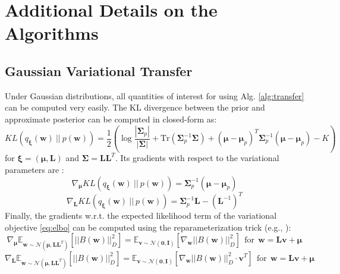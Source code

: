 \documentclass{article}
\begin{document}
\section{Additional Details on the Algorithms}

\subsection{Gaussian Variational Transfer}

Under Gaussian distributions, all quantities of interest for using Alg. \ref{alg:transfer} can be computed very easily. The KL divergence between the prior and approximate posterior can be computed in closed-form as:
\begin{equation}
KL\left(q_{\bm{\xi}}(\bm{w})\ ||\ p(\bm{w})\right) = \frac{1}{2}\left( \log\frac{\left\lvert \bm{\Sigma}_p \right\rvert}{\left\lvert \bm{\Sigma} \right\rvert} + \text{Tr}\left( \bm{\Sigma}_p^{-1}\bm{\Sigma} \right) + (\bm{\mu} - \bm{\mu}_p)^T \bm{\Sigma}_p^{-1} (\bm{\mu} - \bm{\mu}_p) -K \right)
\end{equation}
for $\bm{\xi} = (\bm{\mu},\bm{L})$ and $\bm{\Sigma} = \bm{LL}^T$. Its gradients with respect to the variational parameters are \cite{}:
\begin{equation}
\nabla_{\bm{\mu}} KL\left(q_{\bm{\xi}}(\bm{w})\ ||\ p(\bm{w})\right) = \bm{\Sigma}_p^{-1} (\bm{\mu} - \bm{\mu}_p)
\end{equation}
\begin{equation}
\nabla_{\bm{L}} KL\left(q_{\bm{\xi}}(\bm{w})\ ||\ p(\bm{w})\right) = \bm{\Sigma}_p^{-1}\bm{L} - (\bm{L}^{-1})^T
\end{equation}
Finally, the gradients w.r.t. the expected likelihood term of the variational objective \eqref{eq:elbo} can be computed using the reparameterization trick (e.g., \cite{}):
\begin{equation}
\nabla_{\bm{\mu}} \mathbb{E}_{\bm{w} \sim \mathcal{N}(\bm{\mu},\bm{LL}^T)}\left[ ||B(\bm{w})||_{D}^2 \right] = \mathbb{E}_{\bm{v} \sim \mathcal{N}(\bm{0},\bm{I})}\left[ \nabla_{\bm{w}} ||B(\bm{w})||_{D}^2 \right]\ \ \text{for}\ \ \bm{w} = \bm{Lv} + \bm{\mu}
\end{equation}
\begin{equation}
\nabla_{\bm{L}} \mathbb{E}_{\bm{w} \sim \mathcal{N}(\bm{\mu},\bm{LL}^T)}\left[ ||B(\bm{w})||_{D}^2 \right] = \mathbb{E}_{\bm{v} \sim \mathcal{N}(\bm{0},\bm{I})}\left[ \nabla_{\bm{w}} ||B(\bm{w})||_{D}^2 \cdot \bm{v}^T \right]\ \ \text{for}\ \ \bm{w} = \bm{Lv} + \bm{\mu}
\end{equation}
\end{document}
